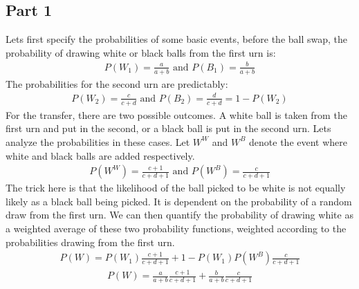 \documentclass{article}
\begin{document}
\subsection*{Part 1}
Lets first specify the probabilities of some basic events, before the ball swap, the probability of drawing white or black balls from the first urn is:
\begin{align*}
P(W_1) = \frac{a}{a+b} \text{ and } P(B_1) = \frac{b}{a+b}
\end{align*}
The probabilities for the second urn are predictably:
\begin{align*}
P(W_2) = \frac{c}{c+d} \text{ and } P(B_2) = \frac{d}{c+d} = 1-P(W_2)
\end{align*}
For the transfer, there are two possible outcomes. A white ball is taken from the first urn and put in the second, or a black ball is put in the second urn. Lets analyze the probabilities in these cases.
Let $W^W$ and $W^B$ denote the event where white and black balls are added respectively. 
\begin{align*}
P(W^W) = \frac{c+1}{c+d+1} \text{ and } P(W^B) = \frac{c}{c+d+1}
\end{align*}
The trick here is that the likelihood of the ball picked to be white is not equally likely as a black ball being picked. It is dependent on the probability of a random draw from the first urn. We can then quantify the probability of drawing white as a weighted average of these two probability functions, weighted according to the probabilities drawing from the first urn.
\begin{align*}
P(W) = P(W_1)\frac{c+1}{c+d+1} + 1-P(W_1) P(W^B) \frac{c}{c+d+1}
\end{align*}
\begin{align*}
\boxed{P(W) = \frac{a}{a+b}  \frac{c+1}{c+d+1} + \frac{b}{a+b} \frac{c}{c+d+1}}
\end{align*}
\end{document}
